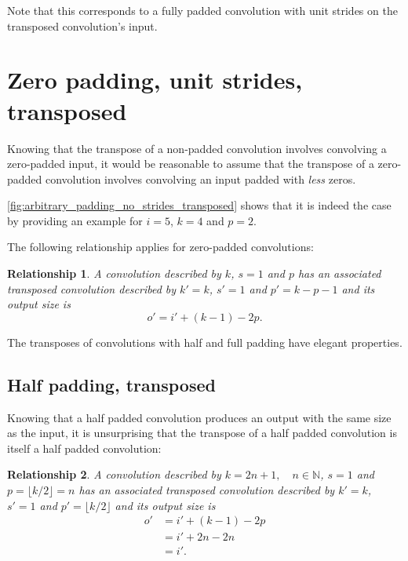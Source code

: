 \documentclass{report}
\newtheorem{relationship}{Relationship}
\begin{document}
Note that this corresponds to a fully padded convolution with unit strides on
the transposed convolution's input.

\section{Zero padding, unit strides, transposed}

Knowing that the transpose of a non-padded convolution involves convolving a
zero-padded input, it would be reasonable to assume that the transpose of a
zero-padded convolution involves convolving an input padded with {\em less}
zeros.

\autoref{fig:arbitrary_padding_no_strides_transposed} shows that it is indeed
the case by providing an example for $i = 5$, $k = 4$ and $p = 2$.

The following relationship applies for zero-padded convolutions:

\begin{relationship}\label{rel:arbitrary_padding_no_strides_transposed}
A convolution described by $k$, $s = 1$ and $p$ has an associated transposed
convolution described by $k' = k$, $s' = 1$ and $p' = k - p - 1$ and its output
size is
\begin{equation*}
    o' = i' + (k - 1) - 2p.
\end{equation*}
\end{relationship}

The transposes of convolutions with half and full padding have elegant
properties.

\subsection{Half padding, transposed}

Knowing that a half padded convolution produces an output with the same size as
the input, it is unsurprising that the transpose of a half padded convolution
is itself a half padded convolution:

\begin{relationship}\label{rel:half_padding_no_strides_transposed}
A convolution described by $k = 2n + 1, \quad n \in \mathbb{N}$, $s = 1$ and $p
= \lfloor k / 2 \rfloor = n$ has an associated transposed convolution described
by $k' = k$, $s' = 1$ and $p' = \lfloor k / 2 \rfloor$ and its output size is
\begin{equation*}
\begin{split}
    o' &= i' + (k - 1) - 2p \\
       &= i' + 2n - 2n \\
       &= i'.
\end{split}
\end{equation*}
\end{relationship}
\end{document}
